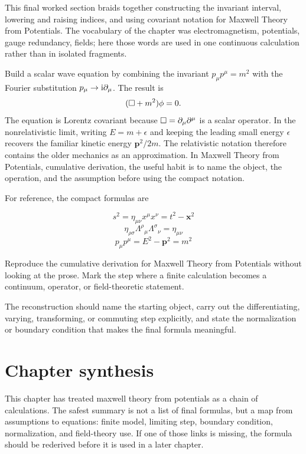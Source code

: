 This final worked section braids together constructing the invariant interval, lowering and raising indices, and using covariant notation for Maxwell Theory from Potentials.  The vocabulary of the chapter was electromagnetism, potentials, gauge redundancy, fields; here those words are used in one continuous calculation rather than in isolated fragments.

Build a scalar wave equation by combining the invariant \(p_\mu p^\mu=m^2\) with the Fourier substitution \(p_\mu\to\mathrm i\partial_\mu\).  The result is
\[
  (\Box+m^2)\phi=0.
\]
The equation is Lorentz covariant because \(\Box=\partial_\mu\partial^\mu\) is a scalar operator.  In the nonrelativistic limit, writing \(E=m+\epsilon\) and keeping the leading small energy \(\epsilon\) recovers the familiar kinetic energy \(\bm p^2/2m\).  The relativistic notation therefore contains the older mechanics as an approximation.  In Maxwell Theory from Potentials, cumulative derivation, the useful habit is to name the object, the operation, and the assumption before using the compact notation.

For reference, the compact formulas are

\[
  s^2=\eta_{\mu\nu}x^\mu x^\nu=t^2-\bm x^2
\]
\[
  \eta_{\rho\sigma}\Lambda^\rho{}_\mu\Lambda^\sigma{}_\nu=\eta_{\mu\nu}
\]
\[
  p_\mu p^\mu=E^2-\bm p^2=m^2
\]

\begin{exercise}
Reproduce the cumulative derivation for Maxwell Theory from Potentials without looking at the prose.  Mark the step where a finite calculation becomes a continuum, operator, or field-theoretic statement.
\begin{answer}
The reconstruction should name the starting object, carry out the differentiating, varying, transforming, or commuting step explicitly, and state the normalization or boundary condition that makes the final formula meaningful.
\end{answer}
\end{exercise}



\section{Chapter synthesis}

This chapter has treated maxwell theory from potentials as a chain of calculations.  The safest summary is not a list of final formulas, but a map from assumptions to equations: finite model, limiting step, boundary condition, normalization, and field-theory use.  If one of those links is missing, the formula should be rederived before it is used in a later chapter.

